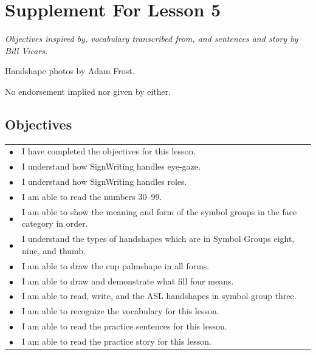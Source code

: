 \documentclass{article}
\begin{document}
\newfontfamily{}
\newfontfamily{}
\newcommand{\bul}{\hfil$\bullet$&}
\renewenvironment{glossary}{\begin{multicols}{5}\begin{center}}{\end{center}\end{multicols}}
\setcounter{secnumdepth}{0}
\setlength{\columnseprule}{1pt}

\section{Supplement For Lesson 5}

\begin{center}
\it
Objectives inspired by, vocabulary transcribed from, and sentences and story by Bill Vicars.

Handshape photos by Adam Frost.

No endorsement implied nor given by either.
\end{center}

\subsection{Objectives}

\begin{tabular}{p{1cm}p{14cm}}
\bul I have completed the objectives for this lesson.\\
\bul I understand how SignWriting handles eye-gaze.\\
\bul I understand how SignWriting handles roles.\\
\bul I am able to read the numbers 30--99.\\
\bul I am able to show the meaning and form of the symbol groups in the face category in order.\\
\bul I understand the types of handshapes which are in Symbol Groups eight, nine, and thumb.\\
\bul I am able to draw the cup palmshape in all forms.\\
\bul I am able to draw and demonstrate what fill four means.\\
\bul I am able to read, write, and the ASL handshapes in symbol group three.\\
\bul I am able to recognize the vocabulary for this lesson.\\
\bul I am able to read the practice sentences for this lesson.\\
\bul I am able to read the practice story for this lesson.\\
\end{tabular}
\end{document}
